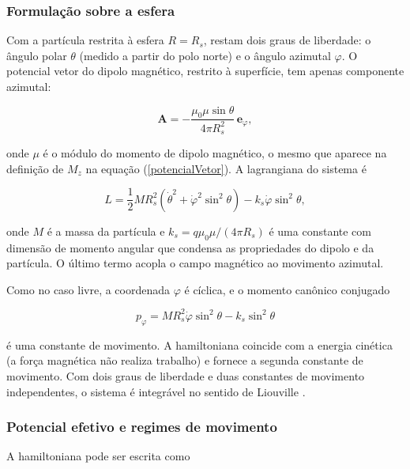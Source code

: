 \documentclass[twocolumn]{rbef}
\begin{document}
\subsubsection{Formulação sobre a esfera}

Com a partícula restrita à esfera $R = R_s$, restam dois graus de liberdade: o ângulo polar $\theta$ (medido a partir do polo norte) e o ângulo azimutal $\varphi$. O potencial vetor do dipolo magnético, restrito à superfície, tem apenas componente azimutal:

\begin{equation}\label{Asfera}
    \boldsymbol{A} = -\dfrac{\mu_0 \mu \sin\theta}{4\pi R_s^2}\,\boldsymbol{e}_\varphi,
\end{equation}

\noindent onde $\mu$ é o módulo do momento de dipolo magnético, o mesmo que aparece na definição de $M_z$ na equação (\ref{potencialVetor}). A lagrangiana do sistema é

\begin{equation}\label{lagSfera}
    L = \dfrac{1}{2}MR_s^2\left(\dot{\theta}^2 + \dot{\varphi}^2\sin^2\theta\right) - k_s\dot{\varphi}\sin^2\theta,
\end{equation}

\noindent onde $M$ é a massa da partícula e $k_s = q\mu_0 \mu/(4\pi R_s)$ é uma constante com dimensão de momento angular que condensa as propriedades do dipolo e da partícula. O último termo acopla o campo magnético ao movimento azimutal.

Como no caso livre, a coordenada $\varphi$ é cíclica, e o momento canônico conjugado

\begin{equation}\label{pphiSfera}
    p_\varphi = MR_s^2\dot{\varphi}\sin^2\theta - k_s\sin^2\theta
\end{equation}

\noindent é uma constante de movimento. A hamiltoniana coincide com a energia cinética (a força magnética não realiza trabalho) e fornece a segunda constante de movimento. Com dois graus de liberdade e duas constantes de movimento independentes, o sistema é integrável no sentido de Liouville \cite{Saletan}.

\subsubsection{Potencial efetivo e regimes de movimento}

A hamiltoniana pode ser escrita como
\end{document}
